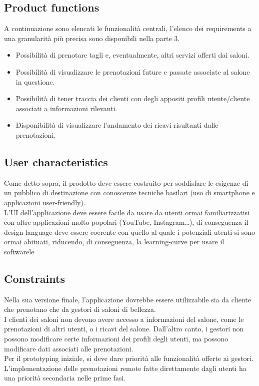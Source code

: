 \documentclass{article}
\begin{document}
\subsection {Product functions} 
A continuazione sono elencati le funzionalità centrali, l’elenco dei requirements a una granularità più precisa sono disponibili nella parte 3.
\begin{itemize}
\item Possibilità di prenotare tagli e, eventualmente, altri servizi offerti dai saloni.
\item Possibilità di visualizzare le prenotazioni future e passate associate al salone in questione.
\item Possibilità di tener traccia dei clienti con degli appositi profili utente/cliente associati a informazioni rilevanti.
\item Disponibilità di visualizzare l’andamento dei ricavi risultanti dalle prenotazioni. 
\end{itemize}
\subsection {User characteristics} 
Come detto sopra, il prodotto deve essere costruito per soddisfare le esigenze di un pubblico di destinazione con conoscenze tecniche basilari (uso di smartphone e applicazioni user-friendly). 
\\L’UI dell’applicazione deve essere facile da usare da utenti ormai familiarizzatisi con altre applicazioni molto popolari (YouTube, Instagram…), di conseguenza il design-language deve essere coerente con quello al quale i potenziali utenti si sono ormai abituati, riducendo, di conseguenza, la learning-curve per usare il softwarele
\subsection {Constraints} 
Nella sua versione finale, l’applicazione dovrebbe essere utilizzabile sia da cliente che prenotano che da gestori di saloni di bellezza. 
\\I clienti dei saloni non devono avere accesso a informazioni del salone, come le prenotazioni di altri utenti, o i ricavi del salone. Dall’altro canto, i gestori non possono modificare certe informazioni dei profili degli utenti, ma possono modificare dati associati alle prenotazioni. 
\\Per il prototyping iniziale, si deve dare priorità alle funzionalità offerte ai gestori. L’implementazione delle prenotazioni remote fatte direttamente dagli utenti ha una priorità secondaria nelle prime fasi.
\end{document}
